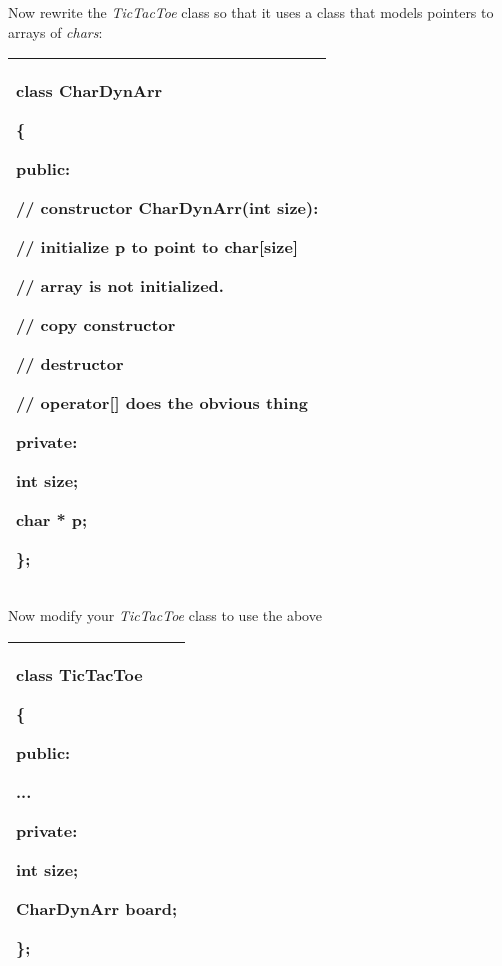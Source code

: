 \documentclass[
]{article}
\begin{document}
Now rewrite the \emph{TicTacToe} class so that it uses a class that
models pointers to arrays of \emph{chars}:

\begin{longtable}[]{@{}l@{}}
\toprule
\endhead
\begin{minipage}[t]{0.97\columnwidth}\raggedright
class CharDynArr

\{

public:

// constructor CharDynArr(int size):

// initialize p to point to char{[}size{]}

// array is not initialized.

// copy constructor

// destructor

// operator{[}{]} does the obvious thing

private:

int size;

char * p;

\};\strut
\end{minipage}\tabularnewline
\bottomrule
\end{longtable}

Now modify your \emph{TicTacToe} class to use the above

\begin{longtable}[]{@{}l@{}}
\toprule
\endhead
\begin{minipage}[t]{0.97\columnwidth}\raggedright
class TicTacToe

\{

public:

...

private:

int size;

\textbf{CharDynArr board; }

\};\strut
\end{minipage}\tabularnewline
\bottomrule
\end{longtable}
\end{document}
